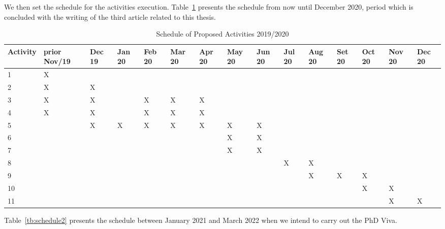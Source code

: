 We then set the schedule for the activities execution. Table~\ref{tb:schedule1} presents the schedule from now until December 2020, period which is concluded with the writing of the third article related to this thesis.

\begin{table}[htbp]
\tiny
\begin{flushleft}
\begin{tabular}{|p{1.0cm}|p{0.8cm}|p{0.35cm}|p{0.4cm}|p{0.4cm}|p{0.4cm}|p{0.4cm}|p{0.4cm}|p{0.4cm}|p{0.4cm}|p{0.4cm}|p{0.4cm}|p{0.4cm}|p{0.4cm}|p{0.4cm}|}
\hline
\textbf{Activity}&	\textbf{prior Nov/19}&	\textbf{Dec 19}&	\textbf{Jan 20}&	\textbf{Feb 20}&	\textbf{Mar 20}&	\textbf{Apr 20}&	\textbf{May 20}&	\textbf{Jun 20}&	\textbf{Jul 20}&	\textbf{Aug 20}&	\textbf{Set 20}&	\textbf{Oct 20}&	\textbf{Nov 20}&	\textbf{Dec 20}\\
\hline	1 &	X &	&	&	&	&	&	&	&	&	& & & &	\\
\hline	2 &	X &	X &	&	&	&	&	&	&	&	& & & &	\\
\hline	3 &	X &	X &	& X & X & X &	&	&	&	& & & &	\\
\hline	4 &	X &	X &	& X & X & X &	&	&	&	& & & &	\\

\hline	5 &	& X & X & X & X & X & X & X & &	& & & &	\\
\hline	6 & & & & &	&	& X & X &	&	&	&	&	&	\\
\hline	7 & & & & &	&	& X & X &	&	&	&	&	&	\\
\hline	8 & & & & &	&	&	&	& X & X &	&	&	& 	\\

\hline	9 & & & & &	&	&	&	&  & X &	 X &	 X & 	&	\\
\hline	10 & & & & &	&	&	&	&  &  &	  &	 X & X	&	\\
\hline	11 & & & & &	&	&	&	&  &  &	  &	   & X	& X	\\


\hline
\end{tabular}
\end{flushleft}
\caption{Schedule of Proposed Activities 2019/2020}
\label{tb:schedule1}
\end{table}


Table~\ref{tb:schedule2} presents the schedule between January 2021 and March 2022 when we intend to carry out the PhD Viva.

